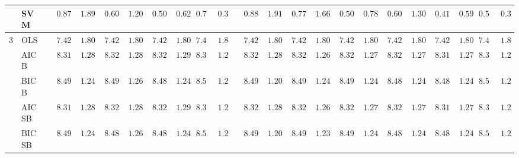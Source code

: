 \begin{tabular}{ll|ll|llllll|llllll|llllll}
 & SVM  & $\phantom{00}0.87$ & $\phantom{00}1.89$ & $\phantom{00}0.60$ & $\phantom{00}1.20$ & $\phantom{00}0.50$ & $\phantom{00}0.62$ & $\phantom{0}0.77$ & $\phantom{0}0.32$ & $\phantom{00}0.88$ & $\phantom{00}1.91$ & $\phantom{00}0.77$ & $\phantom{00}1.66$ & $\phantom{00}0.50$ & $\phantom{00}0.78$ & $\phantom{00}0.60$ & $\phantom{00}1.30$ & $\phantom{00}0.41$ & $\phantom{00}0.59$ & $\phantom{0}0.57$ & $\phantom{0}0.37$ \\\hline
3 & OLS  & $\phantom{00}7.42$ & $\phantom{00}1.80$ & $\phantom{00}7.42$ & $\phantom{00}1.80$ & $\phantom{00}7.42$ & $\phantom{00}1.80$ & $\phantom{0}7.42$ & $\phantom{0}1.80$ & $\phantom{00}7.42$ & $\phantom{00}1.80$ & $\phantom{00}7.42$ & $\phantom{00}1.80$ & $\phantom{00}7.42$ & $\phantom{00}1.80$ & $\phantom{00}7.42$ & $\phantom{00}1.80$ & $\phantom{00}7.42$ & $\phantom{00}1.80$ & $\phantom{0}7.42$ & $\phantom{0}1.80$ \\
 & AIC B  & $\phantom{00}8.31$ & $\phantom{00}1.28$ & $\phantom{00}8.32$ & $\phantom{00}1.28$ & $\phantom{00}8.32$ & $\phantom{00}1.29$ & $\phantom{0}8.33$ & $\phantom{0}1.28$ & $\phantom{00}8.32$ & $\phantom{00}1.28$ & $\phantom{00}8.32$ & $\phantom{00}1.26$ & $\phantom{00}8.32$ & $\phantom{00}1.27$ & $\phantom{00}8.32$ & $\phantom{00}1.27$ & $\phantom{00}8.31$ & $\phantom{00}1.27$ & $\phantom{0}8.31$ & $\phantom{0}1.29$ \\
 & BIC B  & $\phantom{00}8.49$ & $\phantom{00}1.24$ & $\phantom{00}8.49$ & $\phantom{00}1.26$ & $\phantom{00}8.48$ & $\phantom{00}1.24$ & $\phantom{0}8.53$ & $\phantom{0}1.22$ & $\phantom{00}8.49$ & $\phantom{00}1.20$ & $\phantom{00}8.49$ & $\phantom{00}1.24$ & $\phantom{00}8.49$ & $\phantom{00}1.24$ & $\phantom{00}8.48$ & $\phantom{00}1.24$ & $\phantom{00}8.48$ & $\phantom{00}1.24$ & $\phantom{0}8.53$ & $\phantom{0}1.26$ \\
 & AIC SB  & $\phantom{00}8.31$ & $\phantom{00}1.28$ & $\phantom{00}8.32$ & $\phantom{00}1.28$ & $\phantom{00}8.32$ & $\phantom{00}1.29$ & $\phantom{0}8.33$ & $\phantom{0}1.28$ & $\phantom{00}8.32$ & $\phantom{00}1.28$ & $\phantom{00}8.32$ & $\phantom{00}1.26$ & $\phantom{00}8.32$ & $\phantom{00}1.27$ & $\phantom{00}8.32$ & $\phantom{00}1.27$ & $\phantom{00}8.31$ & $\phantom{00}1.27$ & $\phantom{0}8.31$ & $\phantom{0}1.29$ \\
 & BIC SB  & $\phantom{00}8.49$ & $\phantom{00}1.24$ & $\phantom{00}8.48$ & $\phantom{00}1.26$ & $\phantom{00}8.48$ & $\phantom{00}1.24$ & $\phantom{0}8.53$ & $\phantom{0}1.22$ & $\phantom{00}8.49$ & $\phantom{00}1.20$ & $\phantom{00}8.49$ & $\phantom{00}1.23$ & $\phantom{00}8.49$ & $\phantom{00}1.24$ & $\phantom{00}8.48$ & $\phantom{00}1.24$ & $\phantom{00}8.48$ & $\phantom{00}1.24$ & $\phantom{0}8.52$ & $\phantom{0}1.25$ \\

\end{tabular}
